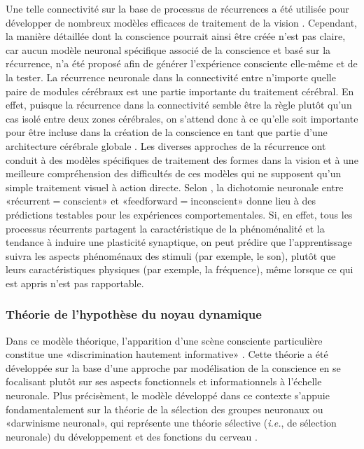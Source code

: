 Une telle connectivité sur la base de processus de récurrences a été utilisée pour développer de nombreux modèles efficaces de traitement de la vision \citep{lamme2000distinct, lamme2003visual, lamme2006towards, pollen2003explicit, taylor2011review}. 
Cependant, la manière détaillée dont la conscience pourrait ainsi être créée n'est pas claire, car aucun modèle neuronal spécifique associé de la conscience et basé sur la récurrence, n'a été proposé afin de générer l'expérience consciente elle-même et de la tester. 
La récurrence neuronale dans la connectivité entre n'importe quelle paire de modules cérébraux est une partie importante du traitement cérébral. 
En effet, puisque la récurrence dans la connectivité semble être la règle plutôt qu'un cas isolé entre deux zones cérébrales, on s'attend donc à ce qu'elle soit importante pour être incluse dans la création de la conscience en tant que partie d'une architecture cérébrale globale \citep{taylor2011review}. 
Les diverses approches de la récurrence ont conduit à des modèles spécifiques de traitement des formes dans la vision et à une meilleure compréhension des difficultés de ces modèles qui ne supposent qu'un simple traitement visuel à action directe. 
Selon \cite{lamme2006towards}, la dichotomie neuronale entre «récurrent$=$conscient» et «feedforward$=$inconscient» donne lieu à des prédictions testables pour les expériences comportementales. 
Si, en effet, tous les processus récurrents partagent la caractéristique de la phénoménalité et la tendance à induire une plasticité synaptique, on peut prédire que l'apprentissage suivra les aspects phénoménaux des stimuli (par exemple, le son), plutôt que leurs caractéristiques physiques (par exemple, la fréquence), même lorsque ce qui est appris n'est pas rapportable. 

\subsubsection{Théorie de l'hypothèse du noyau dynamique}
\label{theoriehypothesenoyaudynamique}

Dans ce modèle théorique, l'apparition d'une scène consciente particulière constitue une «discrimination hautement informative» \citep{edelman2000reentry, tononi1998consciousness}. 
Cette théorie a été développée sur la base d'une approche par modélisation de la conscience en se focalisant plutôt sur ses aspects fonctionnels et informationnels à l'échelle neuronale. 
Plus précisèment, le modèle développé dans ce contexte s'appuie fondamentalement sur la théorie de la sélection des groupes neuronaux ou «darwinisme neuronal», qui représente une théorie sélective (\textit{i.e.}, de sélection neuronale) du développement et des fonctions du cerveau \citep{edelman1987neural, edelman2003naturalizing}. 


